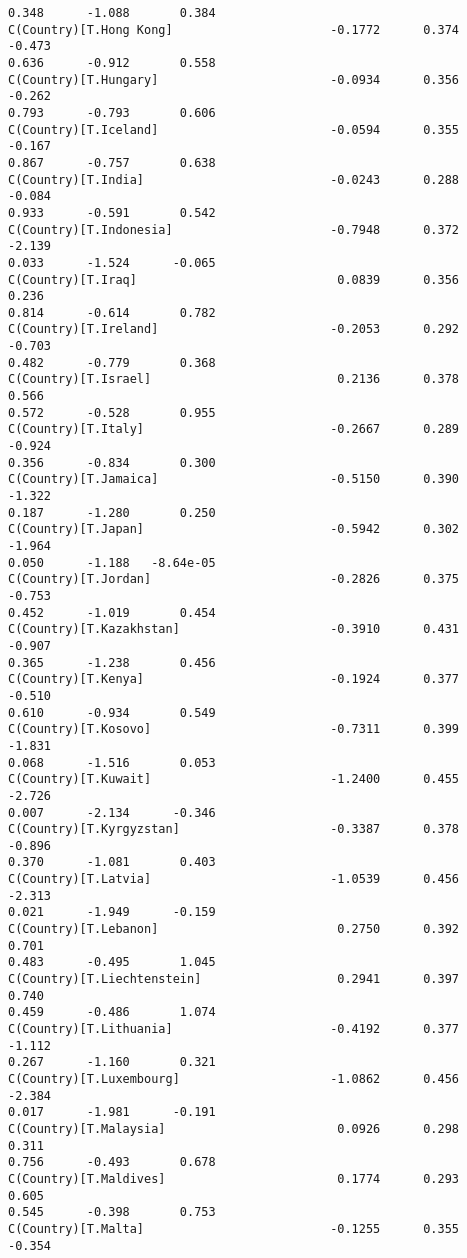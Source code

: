 \documentclass[11pt]{article}
\begin{document}
\begin{Verbatim}[commandchars=\\\{\}]
0.348      -1.088       0.384
C(Country)[T.Hong Kong]                      -0.1772      0.374     -0.473
0.636      -0.912       0.558
C(Country)[T.Hungary]                        -0.0934      0.356     -0.262
0.793      -0.793       0.606
C(Country)[T.Iceland]                        -0.0594      0.355     -0.167
0.867      -0.757       0.638
C(Country)[T.India]                          -0.0243      0.288     -0.084
0.933      -0.591       0.542
C(Country)[T.Indonesia]                      -0.7948      0.372     -2.139
0.033      -1.524      -0.065
C(Country)[T.Iraq]                            0.0839      0.356      0.236
0.814      -0.614       0.782
C(Country)[T.Ireland]                        -0.2053      0.292     -0.703
0.482      -0.779       0.368
C(Country)[T.Israel]                          0.2136      0.378      0.566
0.572      -0.528       0.955
C(Country)[T.Italy]                          -0.2667      0.289     -0.924
0.356      -0.834       0.300
C(Country)[T.Jamaica]                        -0.5150      0.390     -1.322
0.187      -1.280       0.250
C(Country)[T.Japan]                          -0.5942      0.302     -1.964
0.050      -1.188   -8.64e-05
C(Country)[T.Jordan]                         -0.2826      0.375     -0.753
0.452      -1.019       0.454
C(Country)[T.Kazakhstan]                     -0.3910      0.431     -0.907
0.365      -1.238       0.456
C(Country)[T.Kenya]                          -0.1924      0.377     -0.510
0.610      -0.934       0.549
C(Country)[T.Kosovo]                         -0.7311      0.399     -1.831
0.068      -1.516       0.053
C(Country)[T.Kuwait]                         -1.2400      0.455     -2.726
0.007      -2.134      -0.346
C(Country)[T.Kyrgyzstan]                     -0.3387      0.378     -0.896
0.370      -1.081       0.403
C(Country)[T.Latvia]                         -1.0539      0.456     -2.313
0.021      -1.949      -0.159
C(Country)[T.Lebanon]                         0.2750      0.392      0.701
0.483      -0.495       1.045
C(Country)[T.Liechtenstein]                   0.2941      0.397      0.740
0.459      -0.486       1.074
C(Country)[T.Lithuania]                      -0.4192      0.377     -1.112
0.267      -1.160       0.321
C(Country)[T.Luxembourg]                     -1.0862      0.456     -2.384
0.017      -1.981      -0.191
C(Country)[T.Malaysia]                        0.0926      0.298      0.311
0.756      -0.493       0.678
C(Country)[T.Maldives]                        0.1774      0.293      0.605
0.545      -0.398       0.753
C(Country)[T.Malta]                          -0.1255      0.355     -0.354

\end{Verbatim}
\end{document}

